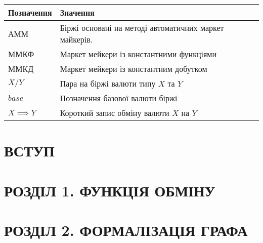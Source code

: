 \documentclass[14pt]{extarticle}
\begin{document}
\begin{center}
	\begin{tabular}{ll}
		Позначення       & Значення                                               \\[0pt]
		\hline{}
		АММ              & Біржі основані на методі автоматичних маркет майкерів. \\[0pt]
		ММКФ             & Маркет мейкери із константними функціями               \\[0pt]
		ММКД             & Маркет мейкери із константним добутком                 \\[0pt]
		\(X/Y\)          & Пара на біржі валюти типу \(X\) та \(Y\)               \\[0pt]
		$base$           & Позначення базової валюти біржі                        \\[0pt]
		\(X \implies Y\) & Короткий запис обміну валюти \(X\) на \(Y\)            \\[0pt]
	\end{tabular}
\end{center}

\newpage

\titleformat{\section}[block]{\Large\bfseries\filcenter}{}{1em}{}
\section*{ВСТУП}\label{sec:intro}



\newpage

\setcounter{section}{0}
\titleformat{\section}[block]{\Large\bfseries\filcenter}{}{1em}{}

\section{РОЗДІЛ 1. ФУНКЦІЯ ОБМІНУ}\label{sec:swap-function}


\newpage

\section{РОЗДІЛ 2. ФОРМАЛІЗАЦІЯ ГРАФА}\label{sec:graph}

\end{document}
